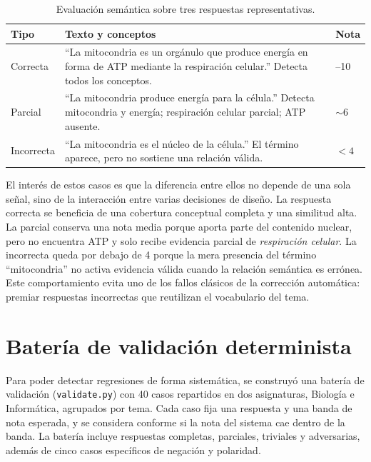 \begin{table}[ht]
\centering
\caption{Evaluación semántica sobre tres respuestas representativas.}
\label{tab:casos}
\small
\begin{tabularx}{\textwidth}{>{\raggedright\arraybackslash}p{} >{\raggedright\arraybackslash}X >{\raggedright\arraybackslash}p{}}
\toprule
Tipo & Texto y conceptos & Nota \\
\midrule
Correcta & ``La mitocondria es un orgánulo que produce energía en forma de ATP mediante la respiración celular.'' Detecta todos los conceptos. & 8--10 \\
Parcial & ``La mitocondria produce energía para la célula.'' Detecta mitocondria y energía; respiración celular parcial; ATP ausente. & $\sim 6$ \\
Incorrecta & ``La mitocondria es el núcleo de la célula.'' El término aparece, pero no sostiene una relación válida. & $<4$ \\
\bottomrule
\end{tabularx}
\end{table}

El interés de estos casos es que la diferencia entre ellos no depende de una sola señal, sino de la interacción entre varias decisiones de diseño. La respuesta correcta se beneficia de una cobertura conceptual completa y una similitud alta. La parcial conserva una nota media porque aporta parte del contenido nuclear, pero no encuentra ATP y solo recibe evidencia parcial de \emph{respiración celular}. La incorrecta queda por debajo de 4 porque la mera presencia del término ``mitocondria'' no activa evidencia válida cuando la relación semántica es errónea. Este comportamiento evita uno de los fallos clásicos de la corrección automática: premiar respuestas incorrectas que reutilizan el vocabulario del tema.

\section{Batería de validación determinista}

Para poder detectar regresiones de forma sistemática, se construyó una batería de validación (\texttt{validate.py}) con 40 casos repartidos en dos asignaturas, Biología e Informática, agrupados por tema. Cada caso fija una respuesta y una banda de nota esperada, y se considera conforme si la nota del sistema cae dentro de la banda. La batería incluye respuestas completas, parciales, triviales y adversarias, además de cinco casos específicos de negación y polaridad.

